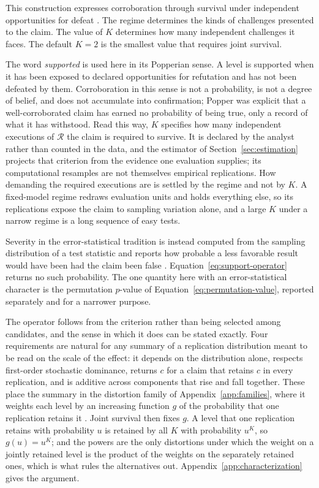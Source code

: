 \documentclass[11pt]{article}
\newcommand{\Regime}{\mathcal{R}}
\theoremstyle{remark}
\begin{document}
This construction expresses corroboration through survival under independent opportunities for defeat \cite{popper1959logic}. The regime determines the kinds of challenges presented to the claim. The value of $K$ determines how many independent challenges it faces. The default $K=2$ is the smallest value that requires joint survival.

The word \emph{supported} is used here in its Popperian sense. A level is supported when it has been exposed to declared opportunities for refutation and has not been defeated by them. Corroboration in this sense is not a probability, is not a degree of belief, and does not accumulate into confirmation; Popper was explicit that a well-corroborated claim has earned no probability of being true, only a record of what it has withstood. Read this way, $K$ specifies how many independent executions of $\Regime$ the claim is required to survive. It is declared by the analyst rather than counted in the data, and the estimator of Section~\ref{sec:estimation} projects that criterion from the evidence one evaluation supplies; its computational resamples are not themselves empirical replications. How demanding the required executions are is settled by the regime and not by $K$. A fixed-model regime redraws evaluation units and holds everything else, so its replications expose the claim to sampling variation alone, and a large $K$ under a narrow regime is a long sequence of easy tests.

Severity in the error-statistical tradition is instead computed from the sampling distribution of a test statistic and reports how probable a less favorable result would have been had the claim been false \cite{mayo1996error}. Equation~\eqref{eq:support-operator} returns no such probability. The one quantity here with an error-statistical character is the permutation $p$-value of Equation~\eqref{eq:permutation-value}, reported separately and for a narrower purpose.

The operator follows from the criterion rather than being selected among candidates, and the sense in which it does can be stated exactly. Four requirements are natural for any summary of a replication distribution meant to be read on the scale of the effect: it depends on the distribution alone, respects first-order stochastic dominance, returns $c$ for a claim that retains $c$ in every replication, and is additive across components that rise and fall together. These place the summary in the distortion family of Appendix~\ref{app:families}, where it weights each level by an increasing function $g$ of the probability that one replication retains it \cite{schmeidler1986integral,yaari1987dual}. Joint survival then fixes $g$. A level that one replication retains with probability $u$ is retained by all $K$ with probability $u^K$, so $g(u)=u^K$; and the powers are the only distortions under which the weight on a jointly retained level is the product of the weights on the separately retained ones, which is what rules the alternatives out. Appendix~\ref{app:characterization} gives the argument.
\end{document}
